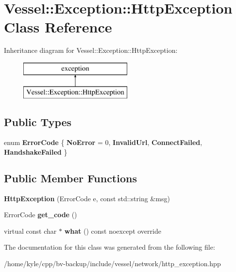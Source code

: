 \hypertarget{class_vessel_1_1_exception_1_1_http_exception}{}\section{Vessel\+:\+:Exception\+:\+:Http\+Exception Class Reference}
\label{class_vessel_1_1_exception_1_1_http_exception}
Inheritance diagram for Vessel\+:\+:Exception\+:\+:Http\+Exception\+:\begin{figure}[H]
\begin{center}
\leavevmode
\includegraphics[height=2.000000cm]{class_vessel_1_1_exception_1_1_http_exception}
\end{center}
\end{figure}
\subsection*{Public Types}
\begin{DoxyCompactItemize}
\item 
\mbox{\label{class_vessel_1_1_exception_1_1_http_exception_ae03e2b1c116d1758e87114e388ca22a7}} 
enum {\bfseries Error\+Code} \{ {\bfseries No\+Error} = 0, 
{\bfseries Invalid\+Url}, 
{\bfseries Connect\+Failed}, 
{\bfseries Handshake\+Failed}
 \}
\end{DoxyCompactItemize}
\subsection*{Public Member Functions}
\begin{DoxyCompactItemize}
\item 
\mbox{\label{class_vessel_1_1_exception_1_1_http_exception_a909f1698f60eef57213bb1ec55086902}} 
{\bfseries Http\+Exception} (Error\+Code e, const std\+::string \&msg)
\item 
\mbox{\label{class_vessel_1_1_exception_1_1_http_exception_afbaa54b8a0ad67e2dd9dd0394f56a2df}} 
Error\+Code {\bfseries get\+\_\+code} ()
\item 
\mbox{\label{class_vessel_1_1_exception_1_1_http_exception_ae3a5bb38fe59f763af267338804a0cef}} 
virtual const char $\ast$ {\bfseries what} () const noexcept override
\end{DoxyCompactItemize}


The documentation for this class was generated from the following file\+:\begin{DoxyCompactItemize}
\item 
/home/kyle/cpp/bv-\/backup/include/vessel/network/http\+\_\+exception.\+hpp\end{DoxyCompactItemize}
